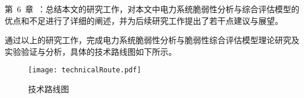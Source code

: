 第~6~章~：总结本文的研究工作，对本文中电力系统脆弱性分析与综合评估模型的优点和不足进行了详细的阐述，并为后续研究工作提出了若干点建议与展望。

通过以上的研究工作，完成电力系统脆弱性分析与脆弱性综合评估模型理论研究及实验验证与分析，具体的技术路线图如下所示。
\begin{figure}[H] %
  \centering
  \texttt{[image: technicalRoute.pdf]}
  \caption{技术路线图}
  \label{fig:technicalRoute}
\end{figure}
